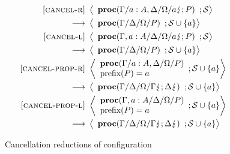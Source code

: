 \documentclass[12pt, openany]{memoir}
\newcommand*{\cancel}[1]{#1 \lightning}
\newcommand*{\procObj}[4]{\textbf{proc}(#1/#2/#3/#4)}
\newcommand*{\cancelSet}[0]{\mathcal{S}}
\begin{document}
\begin{figure}[H]
  \begin{alignat}{2}
    \label{cancelR} \textsc{[cancel-r]} & ~ 
    \Braket{
      \begin{array}{l}
        \procObj{\Gamma}{a : A, \Delta}{\Omega}{\cancel{a}; P}
      \end{array}
      ; \cancelSet
    } \tag*{} \\ ~ \longrightarrow & ~ 
    \Braket{
      \begin{array}{l}
        \procObj{\Gamma}{\Delta}{\Omega}{P}
      \end{array}
      ; \cancelSet \cup \{a\}
    } \tag*{} \\
    \label{cancelL} \textsc{[cancel-l]} & ~ 
    \Braket{
      \begin{array}{l}
        \procObj{\Gamma, a : A}{\Delta}{\Omega}{\cancel{a}; P}
      \end{array}
      ; \cancelSet
    } \tag*{} \\ ~ \longrightarrow & ~ 
    \Braket{
      \begin{array}{l}
        \procObj{\Gamma}{\Delta}{\Omega}{P}
      \end{array}
      ; \cancelSet \cup \{a\}
    } \tag*{} \\
    \label{cancel-prop-r} \textsc{[cancel-prop-r]} & ~ 
    \Braket{
      \begin{array}{l}
        \procObj{\Gamma}{a : A, \Delta}{\Omega}{P}\\
        \text{prefix}(P) = a
      \end{array}
      ; \cancelSet \cup \{a\}
    } \tag*{} \\ ~ \longrightarrow & ~ 
    \Braket{
      \begin{array}{l}
        \procObj{\Gamma}{\Delta}{\Omega}{\cancel{\Gamma}; \cancel{\Delta}} \\
      \end{array}
      ; \cancelSet \cup \{a\}
    } \tag*{} \\
    \label{cancel-prop-l} \textsc{[cancel-prop-l]} & ~ 
    \Braket{
      \begin{array}{l}
        \procObj{\Gamma, a : A}{\Delta}{\Omega}{P} \\
        \text{prefix}(P) = a
      \end{array}
      ; \cancelSet \cup \{a\}
    } \tag*{} \\ ~ \longrightarrow & ~ 
    \Braket{
      \begin{array}{l}
        \procObj{\Gamma}{\Delta}{\Omega}{\cancel{\Gamma}; \cancel{\Delta}}
      \end{array}
      ; \cancelSet \cup \{a\}
    } \tag*{}
  \end{alignat}
  \raggedleft
  \caption{Cancellation reductions of configuration}
  \label{fig:cancelreduction}
\end{figure}
\end{document}
